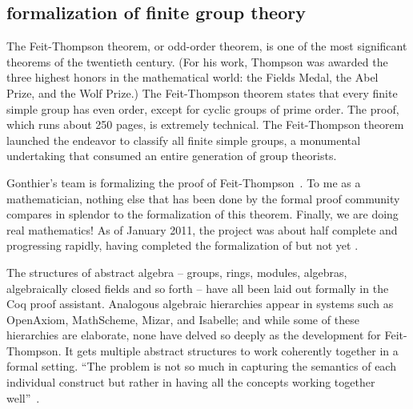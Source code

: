 \documentclass{llncs}
\begin{document}




\subsection{formalization of finite group theory}



The Feit-Thompson theorem, or odd-order theorem, is one of the most
significant theorems of the twentieth century.  (For his work,
Thompson was awarded the three highest honors in
the mathematical world: the Fields Medal, the Abel Prize, and the Wolf
Prize.)  The Feit-Thompson theorem states that every finite simple
group has even order, except for cyclic groups of prime order.  The
proof, which runs about 250 pages, is extremely technical.  The
Feit-Thompson theorem launched the endeavor to classify all finite
simple groups, a monumental undertaking that consumed an entire
generation of group theorists.


Gonthier's team is formalizing the proof of Feit-Thompson~\cite{gonMF}.
To me as a mathematician, nothing else that has been done by the formal
proof community compares in splendor to the formalization of this
theorem.  Finally, we are doing real mathematics!  As of January 2011,
the project was about half complete and progressing rapidly, having
completed the formalization of \cite{BG94} but not yet \cite{P00}.

The structures of abstract algebra -- groups, rings, modules,
algebras, algebraically closed fields and so forth -- have all been
laid out formally in the Coq proof assistant.  Analogous algebraic
hierarchies appear in systems such as OpenAxiom, MathScheme, Mizar, and
Isabelle; and while some of these hierarchies are elaborate, none have
delved so deeply as the development for Feit-Thompson.
It gets multiple abstract structures to work coherently
together in a formal setting. ``The problem is not so much in capturing
the semantics of each individual construct but rather in having all
the concepts working together well''~\cite{gonMF}. 
\end{document}
